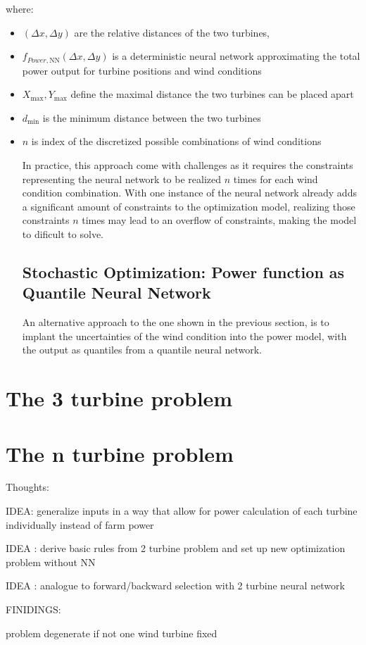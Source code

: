 where:
\begin{itemize}
	\item \( (\Delta x, \Delta y) \) are the relative distances of the two turbines,
	\item \( f_{Power, \text{NN}}(\Delta x, \Delta y)\) is a deterministic neural network  approximating the total power output for turbine positions and wind conditions
	\item \(  X_{\max}, Y_{\max} \) define the maximal distance the two turbines can be placed apart
	\item \( d_{\min} \) is the minimum distance between the two turbines
	\item \( n \) is index of the discretized possible combinations of wind conditions 
	
In practice, this approach come with challenges as it requires the constraints representing the neural network to be realized $n$ times for each wind condition combination. With one instance of the neural network already adds a significant amount of constraints to the optimization model, realizing those constraints $n$ times may lead to an overflow of constraints, making the model to dificult to solve.
	
\subsection{Stochastic Optimization:  Power function as Quantile Neural Network}

An alternative approach to the one shown in the previous section, is to implant the uncertainties of the wind condition into the power model, with the output as quantiles from a quantile neural network. 


	
\end{itemize}

\section{The 3 turbine problem}

\section{The n turbine problem}

Thoughts: 

IDEA: generalize inputs in a way that allow for power calculation of each turbine individually instead of farm power

IDEA : derive basic rules from 2 turbine problem and set up new optimization problem without NN 

IDEA : analogue to forward/backward selection with 2 turbine neural network


FINIDINGS: 

problem degenerate if not one wind turbine fixed